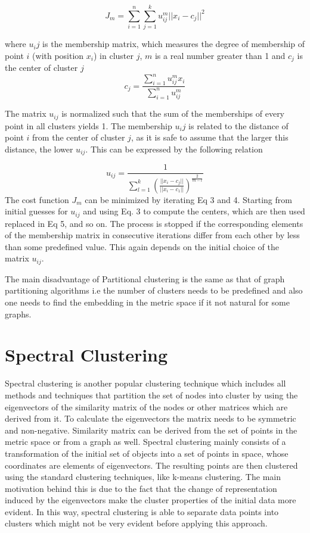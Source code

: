 \documentclass[letterpaper]{article}
\begin{document}
\begin{equation}
J_m = \sum_{i=1}^n \sum_{j=1}^k u_{ij}^m ||x_i-c_j||^2
\end{equation}

where $u_ij$ is the membership matrix, which measures the degree of membership
of point $i$ (with position $x_i$) in cluster $j$, $m$ is a real number greater
than 1 and $c_j$ is the center of cluster $j$
 \begin{equation} c_j =
\frac{\sum_{i=1}^n u_{ij}^m x_i}{\sum_{i=1}^n u_{ij}^m} 
\end{equation}

The matrix $u_{ij}$ is normalized such that the sum of the memberships of every
point in all clusters yields 1. The membership $u_ij$ is related to the distance of point $i$ from the
center of cluster $j$, as it is safe to assume that the larger this distance, the lower $u_{ij}$. This
can be expressed by the following relation

\begin{equation}
u_{ij}=\frac{1}{\sum_{l=1}^k(\frac{||x_i-c_j||}{||x_i-c_1||})^\frac{2}{m-l}}
\end{equation}
The cost function $J_m$ can be minimized by iterating Eq 3 and 4. Starting from
initial guesses for $u_{ij}$ and using Eq. 3 to compute the centers, which are
then used replaced in Eq 5, and so on. The process is stopped if the
corresponding elements of the membership matrix in consecutive iterations
differ from each other by less than some predefined value. This again depends
on the initial choice of the matrix $u_{ij}$.

The main disadvantage of Partitional clustering is the same as that of graph
partitioning algorithms i.e the number of clusters needs to be predefined and
also one needs to find the embedding in the metric space if it not natural for
some graphs.

\section{Spectral Clustering} 
Spectral clustering is another popular clustering technique which includes all
methods and techniques that partition the set of nodes into cluster by using
the eigenvectors of the similarity matrix of the nodes or other matrices which
are derived from it. To calculate the eigenvectors the matrix needs to be
symmetric and non-negative. Similarity matrix can be derived from the set of
points in the metric space or from a graph as well. Spectral clustering mainly
consists of a transformation of the initial set of objects into a set of points
in space, whose coordinates are elements of eigenvectors. The resulting points
are then clustered using the standard clustering techniques, like k-means
clustering. The main motivation behind this is due to the fact that the 
change of representation induced by the eigenvectors make the cluster
properties of the initial data more evident. In this way, spectral clustering
is able to separate data points into clusters which might not be very evident
before applying this approach. 
\end{document}
